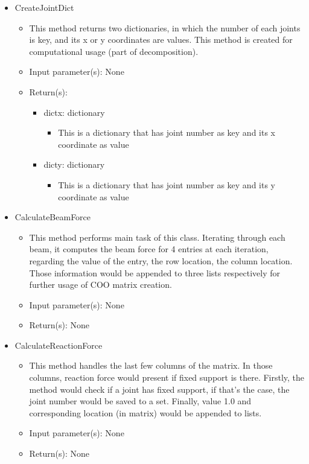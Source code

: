 \documentclass{article}
\begin{document}
\begin{itemize}
\item CreateJointDict
\begin{itemize}
\item This method returns two dictionaries, in which the number of each joints is key, and its x or y coordinates are values. This method is created for computational usage (part of decomposition).
\item Input parameter(s): None
\item Return(s): 
\begin{itemize}
\item dictx: dictionary
\begin{itemize}
\item This is a dictionary that has joint number as key and its x coordinate as value
\end{itemize}
\end{itemize}
\begin{itemize}
\item dicty: dictionary
\begin{itemize}
\item This is a dictionary that has joint number as key and its y coordinate as value
\end{itemize}
\end{itemize}
\end{itemize}
\end{itemize}
\begin{itemize}
\item CalculateBeamForce
\begin{itemize}
\item This method performs main task of this class. Iterating through each beam, it computes the beam force for 4 entries at each iteration, regarding the value of the entry, the row location, the column location. Those information would be appended to three lists respectively for further usage of COO matrix creation. 
\item Input parameter(s): None
\item Return(s): None
\end{itemize}
\end{itemize}
\begin{itemize}
\item CalculateReactionForce
\begin{itemize}
\item This method handles the last few columns of the matrix. In those columns, reaction force would present if fixed support is there. Firstly, the method would check if a joint has fixed support, if that's the case, the joint number would be saved to a set. Finally, value 1.0 and corresponding location (in matrix) would be appended to lists. 
\item Input parameter(s): None
\item Return(s): None
\end{itemize}
\end{itemize}
\end{document}
